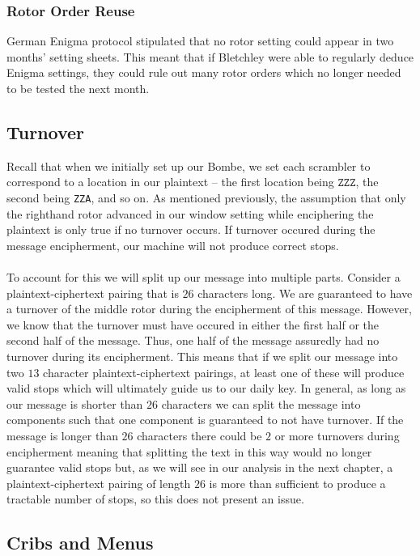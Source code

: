 \subsubsection{Rotor Order Reuse}
German Enigma protocol stipulated that no rotor setting could appear
in two months' setting sheets. This meant that if Bletchley were able
to regularly deduce Enigma settings, they could rule out many rotor
orders which no longer needed to be tested the next month.

\subsection{Turnover}
Recall that when we initially set up our Bombe, we set each scrambler
to correspond to a location in our plaintext -- the first location
being $\texttt{ZZZ}$, the second being \texttt{ZZA}, and so on. As
mentioned previously, the assumption that only the righthand rotor
advanced in our window setting while enciphering the plaintext is
only true if no turnover occurs. If turnover occured during the
message encipherment, our machine will not produce correct stops.
\\\\To account for this we will split up our message into multiple
parts. Consider a plaintext-ciphertext pairing that is $26$
characters long. We are guaranteed to have a turnover of the middle
rotor during the encipherment of this message. However, we know that
the turnover must have occured in either the first half or the second
half of the message. Thus, one half of the message assuredly had no
turnover during its encipherment. This means that if we split our
message into two $13$ character plaintext-ciphertext pairings, at
least one of these will produce valid stops which will ultimately
guide us to our daily key. In general, as long as our message is
shorter than $26$ characters we can split the message into components
such that one component is guaranteed to not have turnover. If the
message is longer than $26$ characters there could be $2$ or more
turnovers during encipherment meaning that splitting the text in this
way would no longer guarantee valid stops but, as we will see in our
analysis in the next chapter, a plaintext-ciphertext pairing of
length $26$ is more than sufficient to produce a tractable number of
stops, so this does not present an issue.
\subsection{Cribs and Menus}

